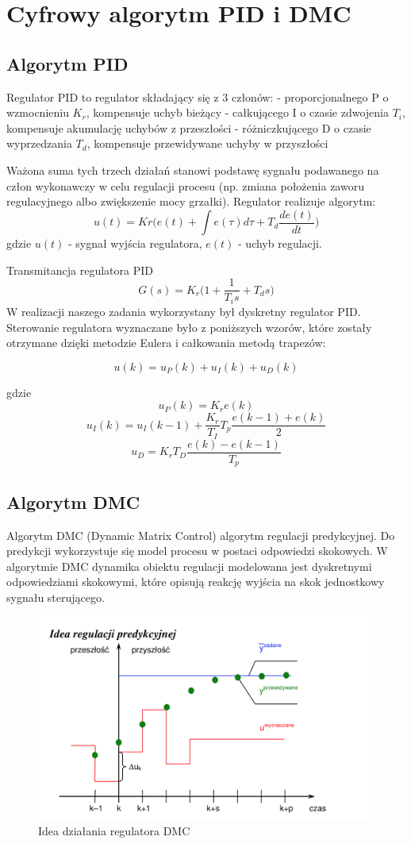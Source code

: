 \section{Cyfrowy algorytm PID i DMC}

\subsection{Algorytm PID}

Regulator PID to regulator składający się z 3 członów:\newline
\indent- proporcjonalnego P o wzmocnieniu $K_{r}$, kompensuje uchyb
bieżący\newline
\indent- całkującego I o czasie zdwojenia $T_{i}$, kompensuje akumulację
uchybów z przeszłości\newline
\indent- różniczkującego D o czasie wyprzedzania $T_{d}$, kompensuje
przewidywane uchyby w przyszłości\newline

Ważona suma tych trzech działań stanowi podstawę sygnału
podawanego na człon wykonawczy w celu regulacji procesu (np.
zmiana położenia zaworu regulacyjnego albo zwiększenie mocy
grzałki).
Regulator realizuje algorytm:
$$u(t) = Kr\Bigg(e(t)+\int e(\tau)d\tau+T_{d}\frac{de(t)}{dt}\Bigg)$$
gdzie $u(t)$ - sygnał wyjścia regulatora, $e(t)$ - uchyb regulacji.

Transmitancja regulatora PID
$$G(s) = K_{r}\Bigg( 1 +\frac{1}{T_{i}s}+T_{d}s\Bigg)$$
W realizacji naszego zadania wykorzystany był dyskretny regulator PID.
Sterowanie regulatora wyznaczane było z poniższych wzorów, które
zostały otrzymane dzięki metodzie Eulera i całkowania metodą
trapezów:

$$u(k)=u_{P}(k)+u_{I}(k)+u_{D}(k)$$

\indent gdzie
$$u_{P}(k)=K_{r}e(k)$$
$$u_{I}(k)=u_{I}(k-1)+\frac{K_{r}}{T_{I}}T_{p}\frac{e(k-1)+e(k)}{2}$$
$$u_{D}=K_{r}T_{D}\frac{e(k)-e(k-1)}{T_{p}}$$


\subsection{Algorytm DMC}

Algorytm DMC (Dynamic Matrix Control) algorytm regulacji predykcyjnej. 
Do predykcji wykorzystuje się model procesu w postaci odpowiedzi skokowych. 
W algorytmie DMC dynamika obiektu regulacji modelowana jest dyskretnymi odpowiedziami skokowymi, 
które opisują reakcję wyjścia na skok jednostkowy sygnału sterującego.
 
\begin{figure}[H]
    \centering
    \includegraphics[scale=0.25]{dmc_idea.png}
    \caption{Idea działania regulatora DMC}
\end{figure}
